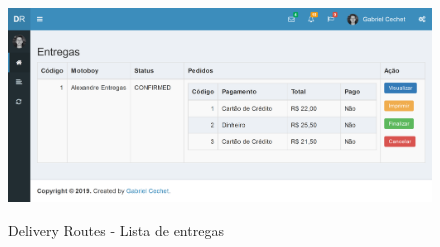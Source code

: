  \begin{figure}[H]
    \centering
    \caption{Delivery Routes - Lista de entregas}
    \includegraphics[width=1.0\textwidth]{./dados/figuras/fig26}
    \label{fig:drListaEntregas}
\end{figure}